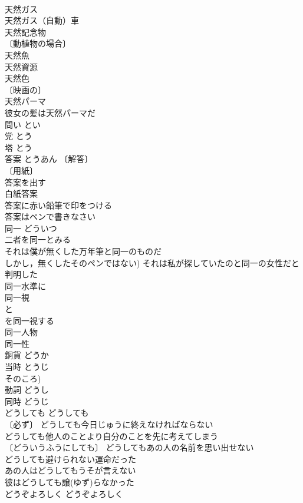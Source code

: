\documentclass[8pt]{extreport}
\begin{document}
\begin{CJK}{UTF8}{min}
\\	天然ガス 
\\	天然ガス（自動）車 
\\	天然記念物 
\\	〔動植物の場合〕
\\	天然魚 
\\	天然資源 
\\	天然色 
\\	〔映画の〕
\\	天然パーマ 
\\	彼女の髪は天然パーマだ 
\\	問い	とい	
\\	党	とう	
\\	塔	とう	
\\	答案	とうあん	〔解答〕
\\	〔用紙〕
\\	答案を出す 
\\	白紙答案 
\\	答案に赤い鉛筆で印をつける 
\\	答案はペンで書きなさい 
\\	同一	どういつ	
\\	二者を同一とみる 
\\	それは僕が無くした万年筆と同一のものだ 
\\	しかし，無くしたそのペンではない) それは私が探していたのと同一の女性だと判明した 
\\	同一水準に 
\\	同一視 
\\	と
\\	を同一視する 
\\	同一人物 
\\	同一性 
\\	銅貨	どうか	
\\	当時	とうじ	
\\	そのころ)
\\	動詞	どうし	
\\	同時	どうじ	
\\	どうしても	どうしても	
\\	〔必ず〕 どうしても今日じゅうに終えなければならない 
\\	どうしても他人のことより自分のことを先に考えてしまう 
\\	〔どういうふうにしても〕 どうしてもあの人の名前を思い出せない 
\\	どうしても避けられない運命だった 
\\	あの人はどうしてもうそが言えない 
\\	彼はどうしても譲(ゆず)らなかった 
\\	どうぞよろしく	どうぞよろしく	

\end{CJK}
\end{document}

